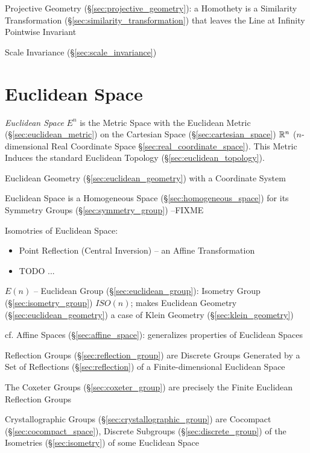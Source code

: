 \fist Projective Geometry (\S\ref{sec:projective_geometry}): a Homothety is a
Similarity Transformation (\S\ref{sec:similarity_transformation}) that leaves
the Line at Infinity Pointwise Invariant

\fist Scale Invariance (\S\ref{sec:scale_invariance})



\section{Euclidean Space}\label{sec:euclidean_space}

\emph{Euclidean Space} $\xspace{E}^n$ is the Metric Space with the Euclidean
Metric (\S\ref{sec:euclidean_metric}) on the Cartesian Space
(\S\ref{sec:cartesian_space}) $\mathbb{R}^n$ ($n$-dimensional Real Coordinate Space
\S\ref{sec:real_coordinate_space}). This Metric Induces the standard Euclidean
Topology (\S\ref{sec:euclidean_topology}).

Euclidean Geometry (\S\ref{sec:euclidean_geometry}) with a Coordinate System

Euclidean Space is a Homogeneous Space (\S\ref{sec:homogeneous_space}) for its
Symmetry Groups (\S\ref{sec:symmetry_group}) --FIXME

Isomotries of Euclidean Space:
\begin{itemize}
  \item Point Reflection (Central Inversion) -- an Affine Transformation
  \item TODO
  ...
\end{itemize}

$E(n)$ -- Euclidean Group (\S\ref{sec:euclidean_group}): Isometry Group
(\S\ref{sec:isometry_group}) $ISO(n)$; makes Euclidean Geometry
(\S\ref{sec:euclidean_geometry}) a case of Klein Geometry
(\S\ref{sec:klein_geometry})

cf. Affine Spaces (\S\ref{sec:affine_space}): generalizes properties
of Euclidean Spaces

Reflection Groups (\S\ref{sec:reflection_group}) are Discrete Groups Generated
by a Set of Reflections (\S\ref{sec:reflection}) of a Finite-dimensional
Euclidean Space

The Coxeter Groups (\S\ref{sec:coxeter_group}) are precisely the Finite
Euclidean Reflection Groups

Crystallographic Groups (\S\ref{sec:crystallographic_group}) are Cocompact
(\S\ref{sec:cocompact_space}), Discrete Subgroups (\S\ref{sec:discrete_group})
of the Isometries (\S\ref{sec:isometry}) of some Euclidean Space



